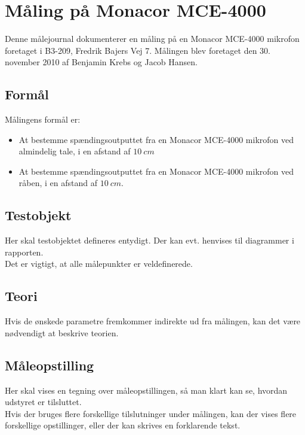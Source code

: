 


\chapter{Måling på Monacor MCE-4000}
\label{mic_output}
Denne målejournal dokumenterer en måling på en Monacor MCE-4000 mikrofon foretaget i B3-209, Fredrik Bajers Vej 7. Målingen blev foretaget den 30. november 2010 af Benjamin Krebs og Jacob Hansen.
\section{Formål}
\label{mic_output_formaal}
Målingens formål er:
\begin{itemize}
\item At bestemme spændingsoutputtet fra en Monacor MCE-4000 mikrofon ved almindelig tale, i en afstand af $10~cm$
\item At bestemme spændingsoutputtet fra en Monacor MCE-4000 mikrofon ved råben, i en afstand af $10~cm$.
\end{itemize}
\section{Testobjekt}
\label{mic_output_testobjekt}
Her skal testobjektet defineres entydigt. Der kan evt. henvises til diagrammer i rapporten.\\
Det er vigtigt, at alle målepunkter er veldefinerede.\\

\section{Teori}
\label{mic_output_teori}
Hvis de ønskede parametre fremkommer indirekte ud fra målingen, kan det være nødvendigt at beskrive teorien.\\

\section{Måleopstilling}
\label{mic_output_maaleopstilling}
Her skal vises en tegning over måleopstillingen, så man klart kan se, hvordan udstyret er tilsluttet.\\
Hvis der bruges flere forskellige tilslutninger under målingen, kan der vises flere forskellige opstillinger, eller der kan skrives en forklarende tekst.\\

